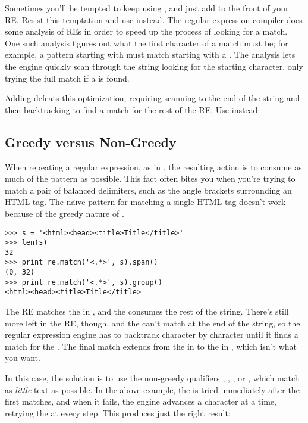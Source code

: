 \documentclass{howto}
\begin{document}
Sometimes you'll be tempted to keep using , and
just add  to the front of your RE.  Resist this temptation
and use  instead.  The regular expression
compiler does some analysis of REs in order to speed up the process of
looking for a match.  One such analysis figures out what the first
character of a match must be; for example, a pattern starting with
 must match starting with a .  The analysis
lets the engine quickly scan through the string looking for the
starting character, only trying the full match if a  is found.

Adding  defeats this optimization, requiring scanning to
the end of the string and then backtracking to find a match for the
rest of the RE.  Use  instead.

\subsection{Greedy versus Non-Greedy}

When repeating a regular expression, as in , the resulting
action is to consume as much of the pattern as possible.  This
fact often bites you when you're trying to match a pair of
balanced delimiters, such as the angle brackets surrounding an HTML
tag.  The na{\"\i}ve pattern for matching a single HTML tag doesn't
work because of the greedy nature of .

\begin{verbatim}
>>> s = '<html><head><title>Title</title>'
>>> len(s)
32
>>> print re.match('<.*>', s).span()
(0, 32)
>>> print re.match('<.*>', s).group()
<html><head><title>Title</title>
\end{verbatim}

The RE matches the \character{<} in , and the
 consumes the rest of the string.  There's still more left
in the RE, though, and the \regexp{>} can't match at the end of
the string, so the regular expression engine has to backtrack
character by character until it finds a match for the \regexp{>}.  
The final match extends from the \character{<} in 
to the \character{>} in , which isn't what you want.

In this case, the solution is to use the non-greedy qualifiers
, , , or
, which match as \emph{little} text as
possible.  In the above example, the \character{>} is tried
immediately after the first \character{<} matches, and when it fails,
the engine advances a character at a time, retrying the \character{>}
at every step.  This produces just the right result:
\end{document}
